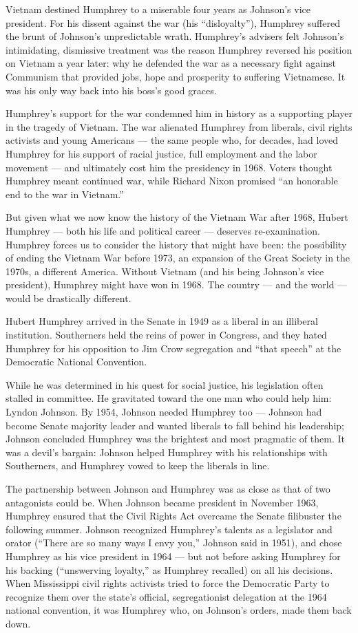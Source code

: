 Vietnam destined Humphrey to a miserable four years as Johnson's vice
president. For his dissent against the war (his ``disloyalty''),
Humphrey suffered the brunt of Johnson's unpredictable wrath. Humphrey's
advisers felt Johnson's intimidating, dismissive treatment was the
reason Humphrey reversed his position on Vietnam a year later: why he
defended the war as a necessary fight against Communism that provided
jobs, hope and prosperity to suffering Vietnamese. It was his only way
back into his boss's good graces.

Humphrey's support for the war condemned him in history as a supporting
player in the tragedy of Vietnam. The war alienated Humphrey from
liberals, civil rights activists and young Americans --- the same people
who, for decades, had loved Humphrey for his support of racial justice,
full employment and the labor movement --- and ultimately cost him the
presidency in 1968. Voters thought Humphrey meant continued war, while
Richard Nixon promised ``an honorable end to the war in Vietnam.''

But given what we now know the history of the Vietnam War after 1968,
Hubert Humphrey --- both his life and political career --- deserves
re-examination. Humphrey forces us to consider the history that might
have been: the possibility of ending the Vietnam War before 1973, an
expansion of the Great Society in the 1970s, a different America.
Without Vietnam (and his being Johnson's vice president), Humphrey might
have won in 1968. The country --- and the world --- would be drastically
different.

Hubert Humphrey arrived in the Senate in 1949 as a liberal in an
illiberal institution. Southerners held the reins of power in Congress,
and they hated Humphrey for his opposition to Jim Crow segregation and
``that speech'' at the Democratic National Convention.

While he was determined in his quest for social justice, his legislation
often stalled in committee. He gravitated toward the one man who could
help him: Lyndon Johnson. By 1954, Johnson needed Humphrey too ---
Johnson had become Senate majority leader and wanted liberals to fall
behind his leadership; Johnson concluded Humphrey was the brightest and
most pragmatic of them. It was a devil's bargain: Johnson helped
Humphrey with his relationships with Southerners, and Humphrey vowed to
keep the liberals in line.

The partnership between Johnson and Humphrey was as close as that of two
antagonists could be. When Johnson became president in November 1963,
Humphrey ensured that the Civil Rights Act overcame the Senate
filibuster the following summer. Johnson recognized Humphrey's talents
as a legislator and orator (``There are so many ways I envy you,''
Johnson said in 1951), and chose Humphrey as his vice president in 1964
--- but not before asking Humphrey for his backing (``unswerving
loyalty,'' as Humphrey recalled) on all his decisions. When Mississippi
civil rights activists tried to force the Democratic Party to recognize
them over the state's official, segregationist delegation at the 1964
national convention, it was Humphrey who, on Johnson's orders, made them
back down.

